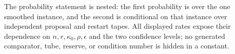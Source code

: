 The probability statement is nested: the first probability is over the one
smoothed instance, and the second is conditional on that instance over
independent proposal and restart tapes.  All displayed rates expose their
dependence on $n,r,\kappa _0,\rho,\epsilon$ and the two confidence levels;
no generated comparator, tube, reserve, or condition number is hidden in a
constant.
